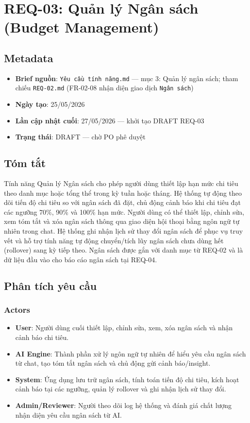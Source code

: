 \section{REQ-03: Quản lý Ngân sách (Budget Management)}



\subsection{Metadata}

\begin{itemize}
\item \textbf{Brief nguồn}: \texttt{Yêu cầu tính năng.md} — mục 3: Quản lý ngân sách; tham chiếu \texttt{REQ-02.md} (FR-02-08 nhận diện giao dịch \texttt{Ngân sách})
\item \textbf{Ngày tạo}: 25/05/2026
\item \textbf{Lần cập nhật cuối}: 27/05/2026 — khởi tạo DRAFT REQ-03
\item \textbf{Trạng thái}: DRAFT — chờ PO phê duyệt
\end{itemize}
\subsection{Tóm tắt}

Tính năng Quản lý Ngân sách cho phép người dùng thiết lập hạn mức chi tiêu theo danh mục hoặc tổng thể trong kỳ tuần hoặc tháng. Hệ thống tự động theo dõi tiến độ chi tiêu so với ngân sách đã đặt, chủ động cảnh báo khi chi tiêu đạt các ngưỡng 70\%, 90\% và 100\% hạn mức. Người dùng có thể thiết lập, chỉnh sửa, xem tóm tắt và xóa ngân sách thông qua giao diện hội thoại bằng ngôn ngữ tự nhiên trong chat. Hệ thống ghi nhận lịch sử thay đổi ngân sách để phục vụ truy vết và hỗ trợ tính năng tự động chuyển/tích lũy ngân sách chưa dùng hết (rollover) sang kỳ tiếp theo. Ngân sách được gắn với danh mục từ REQ-02 và là dữ liệu đầu vào cho báo cáo ngân sách tại REQ-04.



\subsection{Phân tích yêu cầu}



\subsubsection{Actors}

\begin{itemize}
\item \textbf{User}: Người dùng cuối thiết lập, chỉnh sửa, xem, xóa ngân sách và nhận cảnh báo chi tiêu.
\item \textbf{AI Engine}: Thành phần xử lý ngôn ngữ tự nhiên để hiểu yêu cầu ngân sách từ chat, tạo tóm tắt ngân sách và chủ động gửi cảnh báo/insight.
\item \textbf{System}: Ứng dụng lưu trữ ngân sách, tính toán tiến độ chi tiêu, kích hoạt cảnh báo tại các ngưỡng, quản lý rollover và ghi nhận lịch sử thay đổi.
\item \textbf{Admin/Reviewer}: Người theo dõi log hệ thống và đánh giá chất lượng nhận diện yêu cầu ngân sách từ AI.
\end{itemize}
